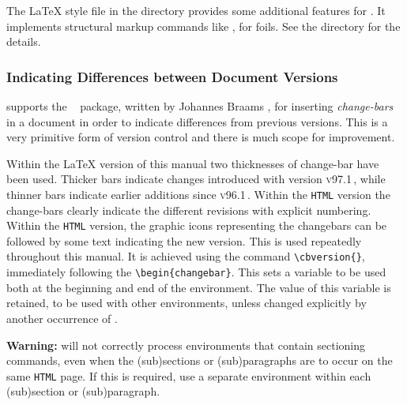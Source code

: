 The \LaTeX{} style file  in the 
directory provides some additional features for \FoilTeX{}. It implements
structural markup commands like ,
 for foils. See the directory  for
the details.



\subsubsection{Indicating Differences between Document Versions}%
\latextohtml{} supports the \LaTeXe\  package,
written by Johannes Braams , for 
inserting \emph{change-bars} in a document in order to indicate 
differences from previous versions. This is a very primitive form of 
version control and there is much scope for improvement.

% 
Within the \LaTeX{} version of this manual two thicknesses of change-bar 
have been used. Thicker bars indicate changes introduced with version \textsc{v97.1}\,,
while thinner bars indicate earlier additions since \textsc{v96.1}\,.\html{\\}
Within the \texttt{HTML} version the change-bars clearly indicate the 
different revisions with explicit numbering.%
Within the \texttt{HTML} version, the graphic icons representing
the changebars can be followed by some text indicating the new version.
This is used repeatedly throughout
this manual. It is achieved using the command 
\verb|\cbversion{|\verb|}|, immediately following
the \verb|\begin{changebar}|. 
This sets a variable  to be used both at the beginning
and end of the environment. The value of this variable is retained,
to be used with other  environments, unless changed explicitly
by another occurrence of .

\smallskip\noindent
\textbf{Warning: }
\latextohtml{} will not correctly process  environments
that contain sectioning commands, even when the (sub)sections or
(sub)paragraphs are to occur on the same \texttt{HTML} page.
If this is required, use a separate  environment
within each (sub)section or (sub)paragraph.




